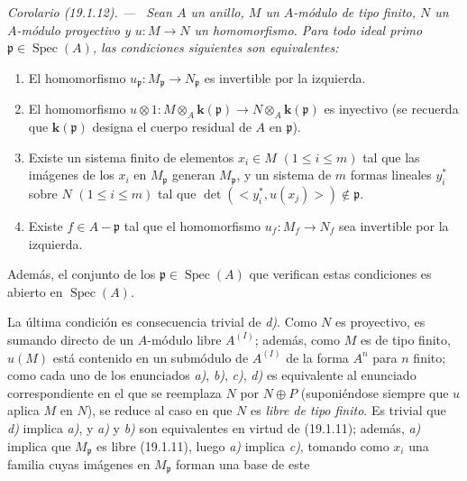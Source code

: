 \documentclass[10pt,oneside]{book}
\makeatletter
\newcommand{\setmanualcurrentlabel}[1]{\def\@currentlabel{#1}}
\newcommand{\oldpage}[2][]{%
  \setcounter{footnote}{0}%
  \marginpar{\scriptsize\textbf{#1}~|~#2}\ignorespaces}
\newenvironment{corollary}[1][]{%
  \setmanualcurrentlabel{#1}\par\medskip\noindent\itshape Corolario (#1). ---\ }{\par}
\providecommand{\setmin}{-}%
\makeatother
\begin{document}
\begin{corollary}[19.1.12]
\label{0.19.1.12-es}
Sean $A$ un anillo, $M$ un $A$-módulo de tipo finito, $N$ un $A$-módulo
proyectivo y $u:M\to N$ un homomorfismo. Para todo ideal primo
$\mathfrak p\in\operatorname{Spec}(A)$, las condiciones siguientes son
equivalentes:
\begin{enumerate}
  \item[\textup{a)}] El homomorfismo
  $u_{\mathfrak p}:M_{\mathfrak p}\to N_{\mathfrak p}$ es invertible por la
  izquierda.
  \item[\textup{b)}] El homomorfismo
  $u\otimes1:M\otimes_A\boldsymbol k(\mathfrak p)\to N\otimes_A\boldsymbol k(\mathfrak p)$ es
  inyectivo \textup{(se recuerda que $\boldsymbol k(\mathfrak p)$ designa el cuerpo residual de $A$
  en $\mathfrak p$)}.
  \item[\textup{c)}] Existe un sistema finito de elementos $x_i\in M$
  $(1\leq i\leq m)$ tal que las imágenes de los $x_i$ en $M_{\mathfrak p}$
  generan $M_{\mathfrak p}$, y un sistema de $m$ formas lineales
  $y_i^*$ sobre $N$ $(1\leq i\leq m)$ tal que
  $\det(\mathopen{<}y_i^*,u(x_j)\mathclose{>})\notin\mathfrak p$.
  \item[\textup{d)}] Existe $f\in A\setmin\mathfrak p$ tal que el homomorfismo
  $u_f:M_f\to N_f$ sea invertible por la izquierda.
\end{enumerate}
Además, el conjunto de los $\mathfrak p\in\operatorname{Spec}(A)$ que verifican
estas condiciones es abierto en $\operatorname{Spec}(A)$.
\end{corollary}

La última condición es consecuencia trivial de \emph{d)}. Como $N$ es proyectivo, es
sumando directo de un $A$-módulo libre $A^{(I)}$; además, como $M$ es de tipo
finito, $u(M)$ está contenido en un submódulo de $A^{(I)}$ de la forma $A^n$
para $n$ finito; como cada uno de los enunciados \emph{a)}, \emph{b)}, \emph{c)}, \emph{d)} es equivalente
al enunciado correspondiente en el que se reemplaza $N$ por $N\oplus P$
(suponiéndose siempre que $u$ aplica $M$ en $N$), se reduce al caso en que $N$
es \emph{libre de tipo finito}. Es trivial que \emph{d)} implica \emph{a)}, y \emph{a)} y \emph{b)} son
equivalentes en virtud de (19.1.11); además, \emph{a)} implica que
$M_{\mathfrak p}$ es libre (19.1.11), luego \emph{a)} implica \emph{c)}, tomando como $x_i$
una familia cuyas imágenes en $M_{\mathfrak p}$ forman una base de este

\oldpage[0\textsubscript{IV-1}]{77}
\end{document}
